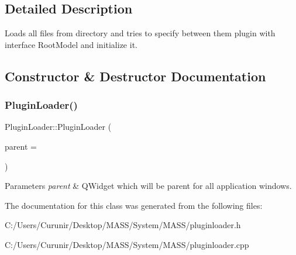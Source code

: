 \subsection{Detailed Description}
Loads all files from directory and tries to specify between them plugin with interface Root\+Model and initialize it. 

\subsection{Constructor \& Destructor Documentation}
\mbox{\label{class_plugin_loader_a94ed19dc21d59ebf15afeb97590cc514}} 
\subsubsection{\texorpdfstring{Plugin\+Loader()}{PluginLoader()}}
{\footnotesize\ttfamily Plugin\+Loader\+::\+Plugin\+Loader (\begin{DoxyParamCaption}\item[{Q\+Widget $\ast$}]{parent = {} }\end{DoxyParamCaption})\hspace{0.3cm}{\ttfamily [explicit]}}


\begin{DoxyParams}{Parameters}
{\em parent} & Q\+Widget which will be parent for all application windows. \\
\hline
\end{DoxyParams}


The documentation for this class was generated from the following files\+:\begin{DoxyCompactItemize}
\item 
C\+:/\+Users/\+Curunir/\+Desktop/\+M\+A\+S\+S/\+System/\+M\+A\+S\+S/pluginloader.\+h\item 
C\+:/\+Users/\+Curunir/\+Desktop/\+M\+A\+S\+S/\+System/\+M\+A\+S\+S/pluginloader.\+cpp\end{DoxyCompactItemize}
